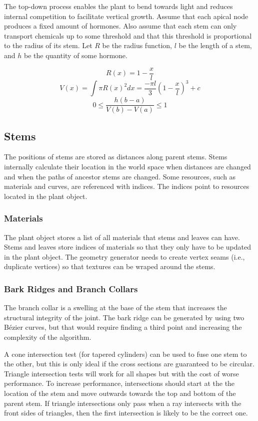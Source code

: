 \documentclass[10pt]{article}
\begin{document}
The top-down process enables the plant to bend towards light and reduces internal competition to facilitate vertical growth. Assume that each apical node produces a fixed amount of hormones. Also assume that each stem can only transport chemicals up to some threshold and that this threshold is proportional to the radius of its stem. Let $ R $ be the radius function, $ l $ be the length of a stem, and $ h $ be the quantity of some hormone.

\[ R(x) = 1 - \frac{x}{l} \]
\[ V(x) = \int \pi R(x)^2 dx = \frac{-\pi l}{3} \left( 1 - \frac{x}{l} \right)^3 + c \]
\[ 0 \leq \frac{h(b-a)}{V(b)-V(a)} \leq 1 \]

\subsection{Stems}
The positions of stems are stored as distances along parent stems. Stems internally calculate their location in the world space when distances are changed and when the paths of ancestor stems are changed. Some resources, such as materials and curves, are referenced with indices. The indices point to resources located in the plant object.

\subsubsection{Materials}
The plant object stores a list of all materials that stems and leaves can have. Stems and leaves store indices of materials so that they only have to be updated in the plant object. The geometry generator needs to create vertex seams (i.e., duplicate vertices) so that textures can be wraped around the stems.

\subsubsection{Bark Ridges and Branch Collars}
The branch collar is a swelling at the base of the stem that increases the structural integrity of the joint. The bark ridge can be generated by using two B\'{e}zier curves, but that would require finding a third point and increasing the complexity of the algorithm.

\setlength{\parindent}{1.5em}
A cone intersection test (for tapered cylinders) can be used to fuse one stem to the other, but this is only ideal if the cross sections are guaranteed to be circular. Triangle intersection tests will work for all shapes but with the cost of worse performance. To increase performance, intersections should start at the the location of the stem and move outwards towards the top and bottom of the parent stem. If triangle intersections only pass when a ray intersects with the front sides of triangles, then the first intersection is likely to be the correct one.
\end{document}
